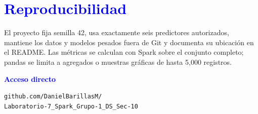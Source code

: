 \documentclass[11pt,letterpaper]{article}
\begin{document}
\section*{\textcolor{Blue}{Reproducibilidad}}

El proyecto fija semilla 42, usa exactamente seis predictores autorizados, mantiene los datos y modelos pesados fuera de Git y documenta su ubicación en el README. Las métricas se calculan con Spark sobre el conjunto completo; pandas se limita a agregados o muestras gráficas de hasta 5,000 registros.

\vfill
\colorbox{Pale}{%
  \parbox{0.95\textwidth}{
    \vspace{7pt}
    \textbf{\textcolor{Blue}{Acceso directo}}\par
    \texttt{github.com/DanielBarillasM/}\\
    \texttt{Laboratorio-7\_Spark\_Grupo-1\_DS\_Sec-10}
    \vspace{7pt}
  }
}
\end{document}
